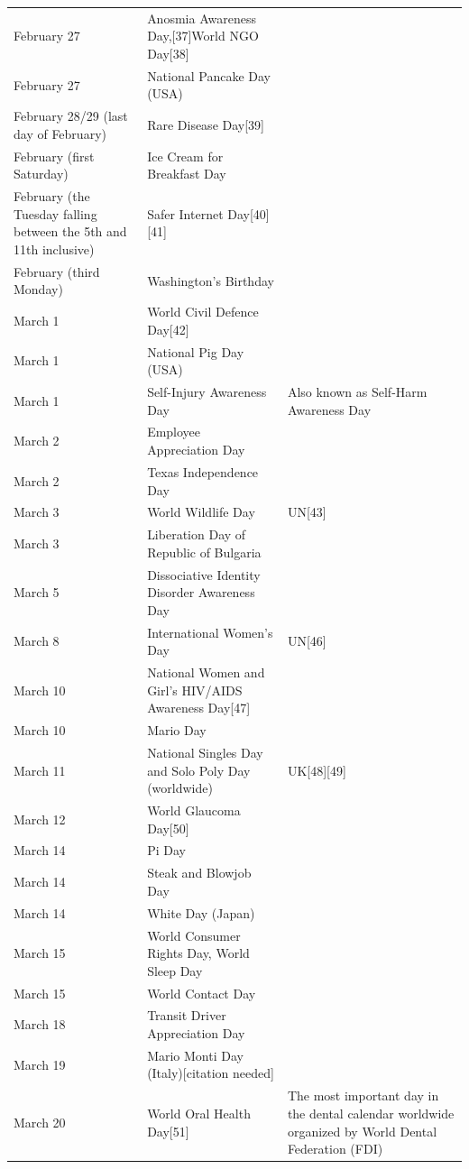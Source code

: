 \documentclass[
  openany]{book}
\begin{document}
\begin{longtable}[t]{>{\raggedright\arraybackslash}p{8em}>{\raggedright\arraybackslash}p{20em}>{\raggedright\arraybackslash}p{12em}}
\addlinespace
February 27 & Anosmia Awareness Day,[37]World NGO Day[38] & \\
February 27 & National Pancake Day (USA) & \\
February 28/29 (last day of February) & Rare Disease Day[39] & \\
February (first Saturday) & Ice Cream for Breakfast Day & \\
February (the Tuesday falling between the 5th and 11th inclusive) & Safer Internet Day[40][41] & \\
\addlinespace
February (third Monday) & Washington's Birthday & \\
March 1 & World Civil Defence Day[42] & \\
March 1 & National Pig Day (USA) & \\
March 1 & Self-Injury Awareness Day & Also known as Self-Harm Awareness Day\\
March 2 & Employee Appreciation Day & \\
\addlinespace
March 2 & Texas Independence Day & \\
March 3 & World Wildlife Day & UN[43]\\
March 3 & Liberation Day of Republic of Bulgaria & [44]\\
March 5 & Dissociative Identity Disorder Awareness Day & [45]\\
March 8 & International Women's Day & UN[46]\\
\addlinespace
March 10 & National Women and Girl's HIV/AIDS Awareness Day[47] & \\
March 10 & Mario Day & \\
March 11 & National Singles Day and Solo Poly Day (worldwide) & UK[48][49]\\
March 12 & World Glaucoma Day[50] & \\
March 14 & Pi Day & \\
\addlinespace
March 14 & Steak and Blowjob Day & \\
March 14 & White Day (Japan) & \\
March 15 & World Consumer Rights Day, World Sleep Day & \\
March 15 & World Contact Day & \\
March 18 & Transit Driver Appreciation Day & \\
\addlinespace
March 19 & Mario Monti Day (Italy)[citation needed] & \\
March 20 & World Oral Health Day[51] & The most important day in the dental calendar worldwide organized by World Dental Federation (FDI)\\

\end{longtable}
\end{document}
